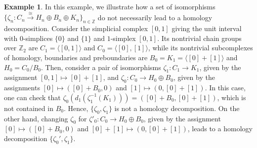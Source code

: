 \documentclass[11pt, table, nothms]{amsart}
\theoremstyle{definition}
\newtheorem{example}[theorem]{Example}
\newcommand{\Z}{\mathbb{Z}}
\newcommand{\cH}{\mathcal{H}}
\begin{document}
{
\begin{example}
    In this example, we illustrate how a set of isomorphisms  $\{\zeta_n \colon C_n\xrightarrow{\cong} H_n \oplus B_n \oplus K_n\}_{n \in \Z}$ do not necessarily lead to a homology decomposition.     
    Consider the simplicial complex $[0,1]$ giving the unit interval with $0$-simplices $\{0\}$ and $\{1\}$ and $1$-simplex $[0,1]$. Its nontrivial chain groups over $\Z_2$ are $C_1=\langle [0,1]\rangle$ and $C_0=\langle [0], [1]\rangle$, while its nontrivial subcomplexes of homology, boundaries and preboundaries are $B_0=K_1=\langle [0]+[1]\rangle$ and $H_0 = C_0/B_0$. 
    Then, consider a pair of isomorphisms $\zeta_1\colon C_1\rightarrow K_1$, given by the assignment $[0,1]\mapsto [0]+[1]$, and $\zeta_0 \colon C_0\rightarrow H_0 \oplus B_0$, given by the assignments $[0]\mapsto ([0]+B_0, 0)$ and $[1]\mapsto (0, [0]+[1])$. 
    In this case, one can check that $\zeta_0(d_1(\zeta_1^{-1}(K_1)))=([0]+B_0, [0]+[1])$, which is not contained in $B_0$. Hence, $\{\zeta_0, \zeta_1\}$ is not a homology decomposition. 
    On the other hand, changing $\zeta_0$ for $\zeta'_0 \colon C_0\rightarrow H_0 \oplus B_0$, given by the assignment $[0]\mapsto ([0]+B_0, 0)$ and $[0]+[1]\mapsto (0, [0]+[1])$, leads to a homology decomposition $\{\zeta_0', \zeta_1\}$.
\end{example}

}
\end{document}
